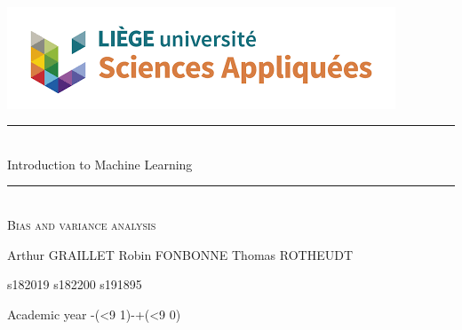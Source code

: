 \documentclass[a4paper,10pt]{article}
\newcommand{\HRule}{\rule{\linewidth}{0.5mm}} %
\newcommand{\schoolyear}{\the\numexpr\year-(\ifnum\month<9 1\else 0\fi)\relax-\the\numexpr\year+(\ifnum\month<9 0\else 1\fi)} %
\begin{document}
\begin{titlepage}
   \begin{center}

    ~\\[4cm]
    \includegraphics[scale=0.9]{images/facsa.png}
    ~\\[1.5cm]
    \HRule \\[0.4cm]
    {\huge Introduction to Machine Learning\\[0.4cm] }

    \HRule \\[1cm]
    
    \textsc{\Large Bias and variance analysis}\\[2cm]
    \vspace{2cm}
    \begin{minipage}{0.3\textwidth}
      \begin{flushleft} \large
        Arthur \textsc{GRAILLET}
        Robin \textsc{FONBONNE}
        Thomas \textsc{ROTHEUDT}
      \end{flushleft}
    \end{minipage}
    \begin{minipage}{0.3\textwidth}
      \begin{flushright}\large
        s182019
        s182200
        s191895
      \end{flushright}
    \end{minipage}

    \vfill

    {\large Academic year \schoolyear}

  \end{center}
\end{titlepage}
\newpage


\end{document}
